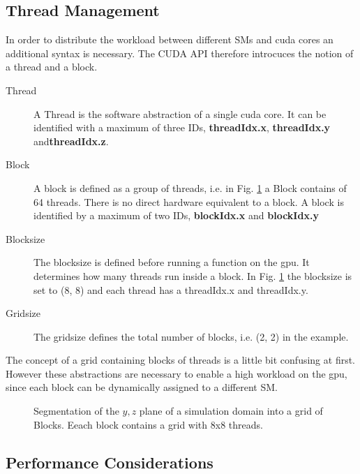 \clearpage

\subsection{Thread Management}

In order to distribute the workload between different SMs and cuda cores an additional syntax is necessary.
The CUDA API therefore  introcuces the notion of a thread and a block.

\begin{description}
    \item[Thread] A Thread is the software abstraction of a single cuda core. It can be identified with
                   a maximum of three IDs, \textbf{threadIdx.x}, \textbf{threadIdx.y} and\textbf{threadIdx.z}.

    \item[Block] A block is defined as a group of threads, i.e. in Fig. \ref{cuda:grid_example} a Block contains of 64 threads.
                 There  is no direct hardware equivalent to a block.
                 A block is identified by a maximum of two IDs, \textbf{blockIdx.x} and \textbf{blockIdx.y}

    \item[Blocksize] The blocksize is defined before running a function on the gpu. It determines how
                    many threads run inside a block. In Fig. \ref{cuda:grid_example} the blocksize is set to (8, 8) and
                    each thread has a threadIdx.x and threadIdx.y.

    \item[Gridsize] The gridsize defines the total number of blocks, i.e. (2, 2) in the example.
\end{description}

The concept of a grid containing blocks of threads is a little bit confusing at first.
However these abstractions are necessary to enable a high workload on the gpu,
since each block can be dynamically assigned to a different SM.


\begin{figure}[!bp]
      \centering
       \caption{Segmentation of the $y, z$ plane of a simulation domain into a grid of Blocks.
                 Eeach block contains a grid with 8x8 threads.}
       \label{cuda:grid_example}
\end{figure}

\subsection{Performance Considerations}

